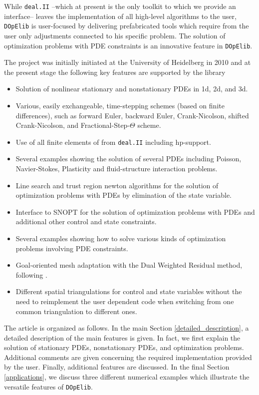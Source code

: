\documentclass[prodmode,acmtoms]{acmsmall}
\numberwithin{equation}{section}
\newcommand{\deal}{\texttt{deal.II}}
\newcommand{\dope}{\texttt{DOpElib}}
\begin{document}
While \deal{} --which at present is the only toolkit to which we provide an 
interface-- leaves the implementation of all high-level algorithms to the user, 
\dope{} is user-focused by delivering
prefabricated tools which require from the user only adjustments connected
to his specific problem. The solution of optimization problems with PDE
constraints is an innovative feature in \dope{}.

The project was initially initiated at the University of Heidelberg in 2010 and  
at the present stage the following key features are supported by the library
\begin{itemize}
\item Solution of nonlinear stationary and nonstationary PDEs in 1d, 2d, and 3d.
\item Various, easily exchangeable, 
  time-stepping schemes (based on finite differences), 
  such as forward Euler, backward Euler,
  Crank-Nicolson, shifted Crank-Nicolson, and Fractional-Step-$\Theta$ scheme.
\item Use of all finite elements of from \deal{} including hp-support.
\item Several examples showing the solution of several PDEs including
   Poisson, Navier-Stokes, Plasticity and fluid-structure interaction problems. 
\item Line search and trust region newton algorithms for the 
   solution of optimization problems with PDEs by elimination of 
   the state variable. \cite{NoWr00} 
\item Interface to SNOPT for the solution of optimization problems with PDEs and
  additional other control and state constraints.
\item Several examples showing how to solve various kinds of optimization 
  problems involving PDE constraints.
\item Goal-oriented mesh adaptation with the Dual Weighted Residual method, 
  following \cite{BR03}.
\item Different spatial triangulations for control and state variables without
  the need to reimplement the user dependent code when switching from one common 
  triangulation to different ones.
\end{itemize}

The article is organized as follows. In the main Section
\ref{detailed_description}, a detailed description of 
the main features is given. In fact, we first explain the solution 
of stationary PDEs, nonstationary PDEs, and optimization problems. 
Additional comments are given concerning the required implementation 
provided by the user.
Finally, additional features are discussed. In the final Section
\ref{applications}, we discuss three different numerical 
examples which illustrate the versatile features of \dope{}. 
\end{document}
